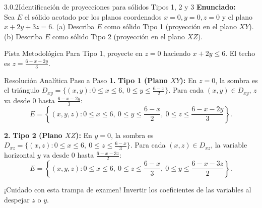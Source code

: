 \documentclass[11pt,a4paper]{article}
\begin{document}
\begin{nivelbox}{3.0.2}{Identificación de proyecciones para sólidos Tipos 1, 2 y 3}
\textbf{Enunciado:}\\
Sea $E$ el sólido acotado por los planos coordenados $x=0, y=0, z=0$ y el plano $x + 2y + 3z = 6$.
(a) Describa $E$ como sólido Tipo 1 (proyección en el plano $XY$).
(b) Describa $E$ como sólido Tipo 2 (proyección en el plano $XZ$).

\begin{observacionbox}{Pista Metodológica}
Para Tipo 1, proyecte en $z=0$ haciendo $x + 2y \le 6$. El techo es $z = \frac{6 - x - 2y}{3}$.
\end{observacionbox}

\begin{ejerciciobox}{Resolución Analítica Paso a Paso}
\smallskip\noindent\textbf{1.} \textbf{Tipo 1 (Plano $XY$):}
En $z = 0$, la sombra es el triángulo $D_{xy} = \{ (x,y) : 0 \le x \le 6, \ 0 \le y \le \frac{6-x}{2} \}$.
Para cada $(x,y) \in D_{xy}$, $z$ va desde $0$ hasta $\frac{6-x-2y}{3}$:
\[E = \left\{ (x,y,z) : 0 \le x \le 6, \ 0 \le y \le \frac{6-x}{2}, \ 0 \le z \le \frac{6-x-2y}{3} \right\}.\]

\smallskip\noindent\textbf{2.} \textbf{Tipo 2 (Plano $XZ$):}
En $y = 0$, la sombra es $D_{xz} = \{ (x,z) : 0 \le x \le 6, \ 0 \le z \le \frac{6-x}{3} \}$.
Para cada $(x,z) \in D_{xz}$, la variable horizontal $y$ va desde $0$ hasta $\frac{6-x-3z}{2}$:
\[E = \left\{ (x,y,z) : 0 \le x \le 6, \ 0 \le z \le \frac{6-x}{3}, \ 0 \le y \le \frac{6-x-3z}{2} \right\}.\]
\end{ejerciciobox}

\begin{errorbox}{¡Cuidado con esta trampa de examen!}
Invertir los coeficientes de las variables al despejar $z$ o $y$.
\end{errorbox}
\end{nivelbox}
\bigskip
\end{document}
